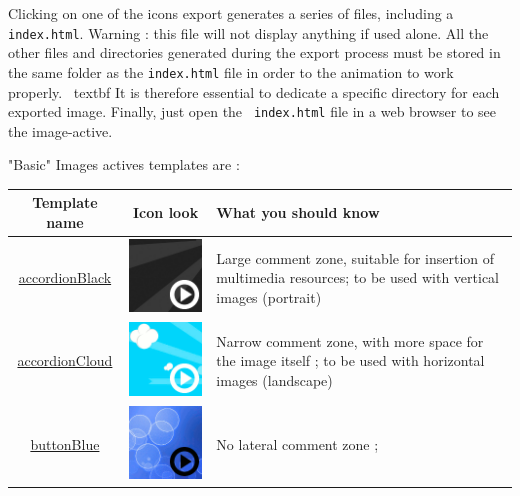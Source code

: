 {Clicking on one of the icons export generates a series of files, including a 
\verb|index.html|. Warning : this file will not display anything if used 
alone. All the other files and directories generated during the export process 
must be stored in  the same folder as the \verb|index.html| file in order to 
the animation to work properly. \ textbf {It is therefore essential to 
dedicate a specific directory for each exported image}. Finally, just open 
the \verb| index.html| file in a web browser to see the image-active.

"Basic" Images actives templates are :
\begin{center}
\begin{tabular}{|c|c|p{3in}|}
\hline
Template name & Icon look & What you should know\\
\hline
\href{http://geoffrey-gekiere.ac-versailles.fr/xia1/accordionBlack}
{accordionBlack}  & \includegraphics[scale=0.5]{./images/accordionBlack} & 
Large comment zone, suitable for insertion of multimedia resources; to be used 
with vertical images (portrait)\\
\hline
\href{http://geoffrey-gekiere.ac-versailles.fr/xia1/accordionCloud}
{accordionCloud} &  \includegraphics[scale=0.5]{./images/accordionCloud}& 
Narrow comment zone, with more space for the image itself ; to be used with 
horizontal images (landscape)\\
\hline
\href{http://geoffrey-gekiere.ac-versailles.fr/xia1/buttonBlue}{buttonBlue}&  
\includegraphics[scale=0.5]{./images/buttonBlue} & No lateral comment zone ; 

\end{tabular}
\end{center}}
